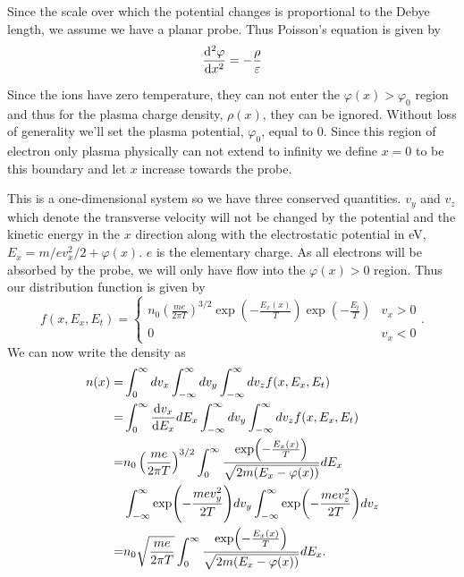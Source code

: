 Since the scale over which the potential changes is proportional to the Debye length, we assume we have a planar probe. Thus Poisson's equation is given by
\begin{equation}
  \dv[2]{\varphi}{x} = -\frac{\rho}{\varepsilon}
  \label{eq:planar_poissons}
\end{equation}

Since the ions have zero temperature, they can not enter the $\varphi(x) > \varphi_0$ region and thus for the plasma charge density, $\rho(x)$, they can be ignored. Without loss of generality we'll set the plasma potential, $\varphi_0$, equal to 0. Since this region of electron only plasma physically can not extend to infinity we define $x = 0$ to be this boundary and let $x$ increase towards the probe.

This is a one-dimensional system so we have three conserved quantities. $v_y$ and $v_z$ which denote the transverse velocity will not be changed by the potential and the kinetic energy in the $x$ direction along with the electrostatic potential in eV, $E_x = m / e v_x^2/2 + \varphi(x)$. $e$ is the elementary charge. As all electrons will be absorbed by the probe, we will only have flow into the $\varphi(x) > 0$ region. Thus our distribution function is given by
\begin{equation}
  f(x, E_x, E_t) = \begin{cases}
    n_0 \left(\frac{m e}{2\pi T}\right)^{3/2} \exp(-\frac{E_x(x)}{T}) \exp(-\frac{E_t}{T}) & v_x > 0 \\
    0 & v_x < 0
  \end{cases}.
  \label{eq:planar_distribution_function}
\end{equation}
We can now write the density as
\begin{align*}
  n(x) =& \int_0^\infty dv_x \int_{-\infty}^\infty dv_y \int_{-\infty}^\infty dv_z f(x, E_x, E_t) \\
  =& \int_0^\infty \dv{v_x}{E_x} dE_x \int_{-\infty}^\infty dv_y \int_{-\infty}^\infty dv_z f(x, E_x, E_t) \\
  =& n_0 \left(\frac{m e}{2\pi T}\right)^{3/2} \int_0^\infty \frac{\exp(-\frac{E_x(x)}{T})}{\sqrt{2m (E_x - \varphi(x))}} dE_x \\
  & \int_{-\infty}^\infty \exp(-\frac{m e v_y^2}{2T}) dv_y \int_{-\infty}^\infty \exp(-\frac{m e v_z^2}{2T}) dv_z \\
  =& n_0 \sqrt{\frac{m e}{2\pi T}} \int_0^\infty \frac{\exp(-\frac{E_x(x)}{T})}{\sqrt{2m (E_x - \varphi(x))}} dE_x.
\end{align*}
